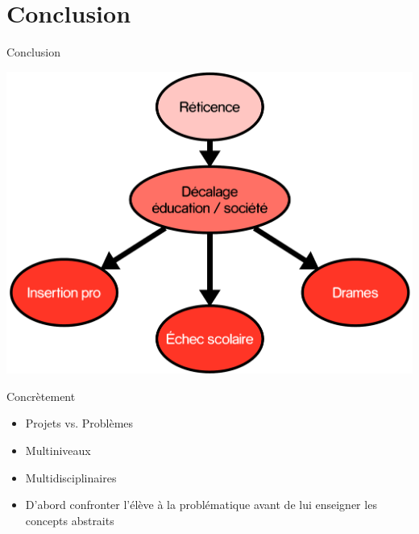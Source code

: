 \section{Conclusion}

\begin{frame}{Conclusion}
   \begin{center}
     \includegraphics[width=.7\textwidth]{../resources/illustrations/ccl}
   \end{center}
\end{frame}

\begin{frame}{Concrètement}
\begin{itemize}
  \item Projets vs. Problèmes
  \item Multiniveaux
  \item Multidisciplinaires
  \item D'abord confronter l'élève à la problématique avant de lui enseigner les concepts abstraits
\end{itemize}
\end{frame}

